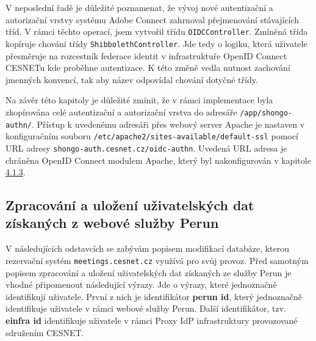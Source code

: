 \documentclass[
  printed, %
  twoside, %
  table,   %
  nolof,     %
  nolot,     %
]{fithesis3}
\begin{document}
\par

V neposlední řadě je důležité poznamenat, že vývoj nové autentizační a autorizační vrstvy systému Adobe Connect zahrnoval přejmenování stávajících tříd. V rámci těchto operací, jsem vytvořil třídu \texttt{OIDCController}. Zmíněná třída kopíruje chování třídy \texttt{ShibbolethController}. Jde tedy o logiku, která uživatele přesměruje na rozcestník federace identit v infrastruktuře OpenID Connect CESNETu kde proběhne autentizace. K této změně vedla nutnost zachování jmenných konvencí, tak aby název odpovídal chování dotyčné třídy. 

\par 

Na závěr této kapitoly je důležité zmínit, že v rámci implementace byla zkopírována celé autentizační a autorizační vrstva do adresáře \texttt{/app/shongo-authn/}. Přístup k uvedenému adresáři přes webový server Apache je nastaven v konfiguračním souboru \texttt{/etc/apache2/sites-available/default-ssl} pomocí URL adresy \texttt{shongo-auth.cesnet.cz/oidc-authn}. Uvedená URL adresa je chráněna OpenID Connect modulem Apache, který byl nakonfigurován v kapitole \hyperref[shongo-location]{4.1.3}.

\subsection{Zpracování a uložení uživatelských dat získaných z webové služby Perun}
V následujících odstavcích se zabývám popisem modifikací databáze, kterou rezervační systém \texttt{meetings.cesnet.cz} využívá pro svůj provoz. Před samotným popisem zpracování a uložení uživatelských dat získaných ze služby Perun je vhodné připomenout následující výrazy. Jde o výrazy, které  jednoznačně identifikují uživatele. První z nich je identifikátor \textbf{perun id}, který jednoznačně identifikuje uživatele v rámci webové služby Perun. Další identifikátor, tzv. \textbf{einfra id} identifikuje uživatele v rámci Proxy IdP infrastruktury provozované sdružením CESNET.  
\par
\end{document}
